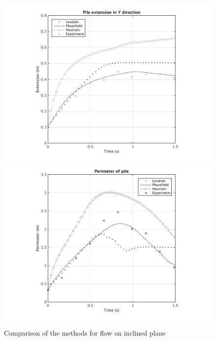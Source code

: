 \documentclass[letterpaper,10pt]{article}
\begin{document}
\begin{figure}[H]
\begin{minipage}[b]{.48\linewidth}
        \end{minipage}
        \begin{minipage}[b]{.48 \linewidth}
                \centering
                \includegraphics[scale=0.48]{IMAGES/yextend.png}
                \includegraphics[scale=0.48]{IMAGES/perimeter.png}
        \end{minipage}
        \caption{Comparison of the methods for flow on inclined plane}
        \label{compinc}
\end{figure}
\end{document}
